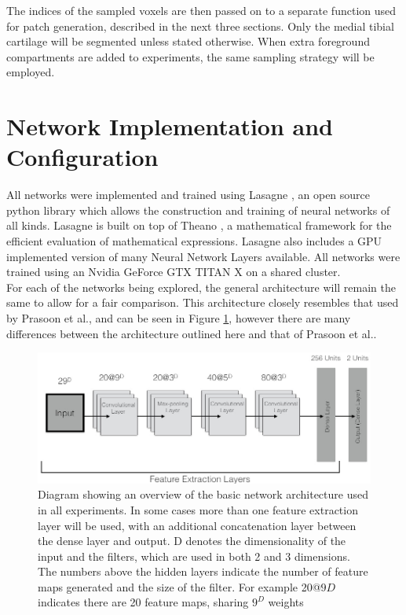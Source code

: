 \documentclass[11pt,a4paper]{memoir}
\numberwithin{figure}{section}
\numberwithin{table}{section}
\numberwithin{equation}{section}
\begin{document}
The indices of the sampled voxels are then passed on to a separate function used for patch generation, described in the next three sections. Only the medial tibial cartilage will be segmented unless stated otherwise. When extra foreground compartments are added to experiments, the same sampling strategy will be employed. \\

\section{Network Implementation and Configuration}
All networks were implemented and trained using Lasagne \cite{Dieleman2015}, an open source python library which allows the construction and training of neural networks of all kinds. Lasagne is built on top of Theano \cite{bergstra+al:2010-scipy}, a mathematical framework for the efficient evaluation of mathematical expressions. Lasagne also includes a GPU implemented version of many Neural Network Layers available. All networks were trained using an Nvidia GeForce GTX TITAN X on a shared cluster.\\

For each of the networks being explored, the general architecture will remain the same to allow for a fair comparison. This architecture closely resembles that used by Prasoon et al.\cite{Prasoon2013DeepNetwork}, and can be seen in Figure \ref{fig:Network}, however there are many differences between the architecture outlined here and that of Prasoon et al.. \\


\begin{figure}[!htbp]
\centering
\includegraphics[width=1\textwidth]{architecture.jpg}
\caption[An overview of the CNN architecture used in experiments presented in this report]{Diagram showing an overview of the basic network architecture used in all experiments. In some cases more than one feature extraction layer will be used, with an additional concatenation layer between the dense layer and output. D denotes the dimensionality of the input and the filters, which are used in both 2 and 3 dimensions. The numbers above the hidden layers indicate the number of feature maps generated and the size of the filter. For example 20@$9D$ indicates there are 20 feature maps, sharing $9^D$ weights}
\label{fig:Network}
\end{figure}
 
\end{document}
